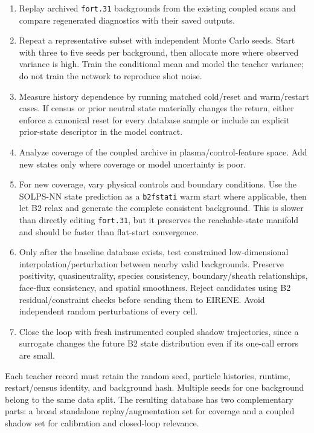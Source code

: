 \documentclass[11pt]{article}
\begin{document}
\begin{enumerate}
\item Replay archived \texttt{fort.31} backgrounds from the existing coupled scans and compare regenerated diagnostics with their saved outputs.
\item Repeat a representative subset with independent Monte Carlo seeds. Start with three to five seeds per background, then allocate more where observed variance is high. Train the conditional mean and model the teacher variance; do not train the network to reproduce shot noise.
\item Measure history dependence by running matched cold/reset and warm/restart cases. If census or prior neutral state materially changes the return, either enforce a canonical reset for every database sample or include an explicit prior-state descriptor in the model contract.
\item Analyze coverage of the coupled archive in plasma/control-feature space. Add new states only where coverage or model uncertainty is poor.
\item For new coverage, vary physical controls and boundary conditions. Use the SOLPS-NN state prediction as a \texttt{b2fstati} warm start where applicable, then let B2 relax and generate the complete consistent background. This is slower than directly editing \texttt{fort.31}, but it preserves the reachable-state manifold and should be faster than flat-start convergence.
\item Only after the baseline database exists, test constrained low-dimensional interpolation/perturbation between nearby valid backgrounds. Preserve positivity, quasineutrality, species consistency, boundary/sheath relationships, face-flux consistency, and spatial smoothness. Reject candidates using B2 residual/constraint checks before sending them to EIRENE. Avoid independent random perturbations of every cell.
\item Close the loop with fresh instrumented coupled shadow trajectories, since a surrogate changes the future B2 state distribution even if its one-call errors are small.
\end{enumerate}

Each teacher record must retain the random seed, particle histories, runtime, restart/census identity, and background hash. Multiple seeds for one background belong to the same data split. The resulting database has two complementary parts: a broad standalone replay/augmentation set for coverage and a coupled shadow set for calibration and closed-loop relevance.
\end{document}

